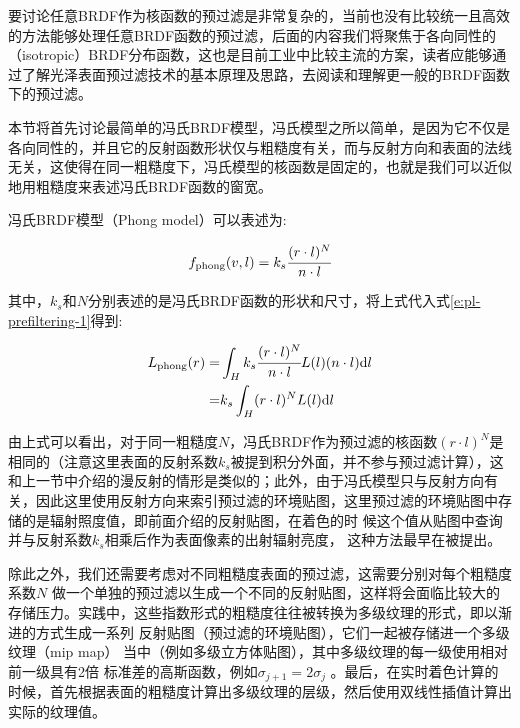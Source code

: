 要讨论任意BRDF作为核函数的预过滤是非常复杂的，当前也没有比较统一且高效的方法能够处理任意BRDF函数的预过滤，后面的内容我们将聚焦于各向同性的（isotropic）BRDF分布函数，这也是目前工业中比较主流的方案，读者应能够通过了解光泽表面预过滤技术的基本原理及思路，去阅读和理解更一般的BRDF函数下的预过滤。

本节将首先讨论最简单的冯氏BRDF模型，冯氏模型之所以简单，是因为它不仅是各向同性的，并且它的反射函数形状仅与粗糙度有关，而与反射方向和表面的法线无关，这使得在同一粗糙度下，冯氏模型的核函数是固定的，也就是我们可以近似地用粗糙度来表述冯氏BRDF函数的窗宽。

冯氏BRDF模型（Phong model）可以表述为:

\begin{equation}
	f_{\rm phong}(v,l)=k_s\cfrac{(r\cdot l)^{N}}{n\cdot l}
\end{equation}

\noindent 其中，$k_s$和$N$分别表述的是冯氏BRDF函数的形状和尺寸，将上式代入式\ref{e:pl-prefiltering-1}得到:

\begin{equation}
	\begin{aligned}
		L_{\rm phong}(r)=&\int_H k_s\cfrac{(r\cdot l)^{N}}{n\cdot l}L(l)(n\cdot l){\rm d}l\\
		=&k_s\int_H(r\cdot l)^{N}L(l){\rm d}l
	\end{aligned}
\end{equation}

由上式可以看出，对于同一粗糙度$N$，冯氏BRDF作为预过滤的核函数$(r\cdot l)^{N}$是相同的（注意这里表面的反射系数$k_s$被提到积分外面，并不参与预过滤计算），这和上一节中介绍的漫反射的情形是类似的；此外，由于冯氏模型只与反射方向有关，因此这里使用反射方向来索引预过滤的环境贴图，这里预过滤的环境贴图中存储的是辐射照度值，即前面介绍的反射贴图，在着色的时 候这个值从贴图中查询并与反射系数$k_s$相乘后作为表面像素的出射辐射亮度， 这种方法最早在\cite{a:Realistichardware-acceleratedshadingandlighting,a:IlluminationandReflectionMaps:SimulatedObjectsinSimulatedandRealEnvironments}被提出。

除此之外，我们还需要考虑对不同粗糙度表面的预过滤，这需要分别对每个粗糙度系数$N$ 做一个单独的预过滤以生成一个不同的反射贴图，这样将会面临比较大的存储压力。实践中，这些指数形式的粗糙度往往被转换为多级纹理的形式\cite{a:Efficientreflectanceandvisibilityapproximationsforenvironmentmaprendering,a:Efficientrenderingofspatialbidirectionalreflectancedistributionfunctions}，即以渐进的方式生成一系列 反射贴图（预过滤的环境贴图），它们一起被存储进一个多级纹理（mip map） 当中（例如多级立方体贴图），其中多级纹理的每一级使用相对前一级具有2倍 标准差的高斯函数，例如$\sigma_{j+1} = 2\sigma_j$ 。最后，在实时着色计算的时候，首先根据表面的粗糙度计算出多级纹理的层级，然后使用双线性插值计算出实际的纹理值。

